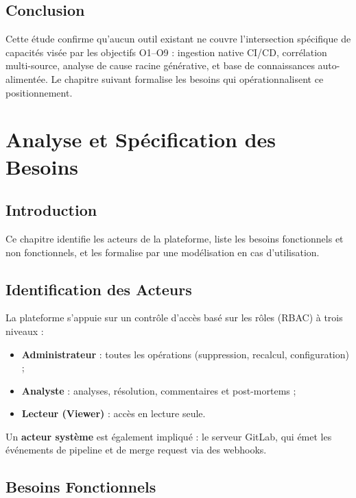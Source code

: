 \documentclass[12pt,a4paper,oneside]{report}
\begin{document}
\section{Conclusion}
Cette étude confirme qu'aucun outil existant ne couvre l'intersection spécifique de capacités visée par les objectifs O1--O9 : ingestion native CI/CD, corrélation multi-source, analyse de cause racine générative, et base de connaissances auto-alimentée. Le chapitre suivant formalise les besoins qui opérationnalisent ce positionnement.

\chapter{Analyse et Spécification des Besoins}\label{chap:requirements}
\section{Introduction}
Ce chapitre identifie les acteurs de la plateforme, liste les besoins fonctionnels et non fonctionnels, et les formalise par une modélisation en cas d'utilisation.

\section{Identification des Acteurs}
La plateforme s'appuie sur un contrôle d'accès basé sur les rôles (RBAC) à trois niveaux :
\begin{itemize}[leftmargin=1.4em]
  \item \textbf{Administrateur} : toutes les opérations (suppression, recalcul, configuration) ;
  \item \textbf{Analyste} : analyses, résolution, commentaires et post-mortems ;
  \item \textbf{Lecteur (Viewer)} : accès en lecture seule.
\end{itemize}
Un \textbf{acteur système} est également impliqué : le serveur GitLab, qui émet les événements de pipeline et de merge request via des webhooks.

\section{Besoins Fonctionnels}
\end{document}
